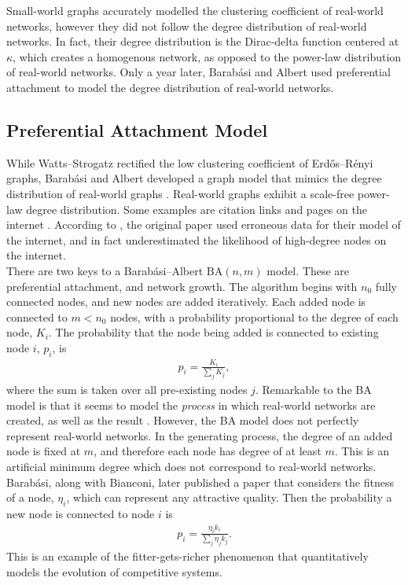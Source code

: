 Small-world graphs accurately modelled the clustering coefficient of real-world networks, however they did not follow the degree distribution of real-world networks. In fact, their degree distribution is the Dirac-delta function centered at $\kappa$, which creates a homogenous network, as opposed to the power-law distribution of real-world networks. Only a year later, Barab\'{a}si and Albert used preferential attachment to model the degree distribution of real-world networks.

 
\subsection{Preferential Attachment Model} \label{BA}
While Watts--Strogatz rectified the low clustering coefficient of Erd\H{o}s--R\'enyi graphs, Barab\'{a}si and Albert developed a graph model that mimics the degree distribution of real-world graphs \cite{RN55}. Real-world graphs exhibit a scale-free power-law degree distribution. Some examples are citation links and pages on the internet \cite{RN55}. According to \cite{RN56}, the original paper used erroneous data for their model of the internet, and in fact underestimated the likelihood of high-degree nodes on the internet. \\

There are two keys to a Barab\'{a}si--Albert $\mathrm{BA}(n,m)$ model. These are preferential attachment, and network growth. The algorithm begins with $n_0$ fully connected nodes, and new nodes are added iteratively. Each added node is connected to $m<n_0$ nodes, with a probability proportional to the degree of each node, $K_i$. The probability that the node being added is connected to existing node $i$, $p_i$, is
\begin{align*}
    p_i = \frac{K_i}{\sum_j K_j},
\end{align*}
where the sum is taken over all pre-existing nodes $j$. Remarkable to the BA model is that it seems to model the \emph{process} in which real-world networks are created, as well as the result \cite{RN55}. However, the BA model does not perfectly represent real-world networks. In the generating process, the degree of an added node is fixed at $m$, and therefore each node has degree of at least $m$. This is an artificial minimum degree which does not correspond to real-world networks. \\

Barab\'{a}si, along with Bianconi, \cite{RN59} later published a paper that considers the fitness of a node, $\eta_i$, which can represent any attractive quality. Then the probability a new node is connected to node $i$ is 
\begin{align*}
    p_i = \frac{\eta_ik_i}{\sum_j \eta_jk_j}.
\end{align*}
This is an example of the fitter-gets-richer phenomenon that quantitatively models the evolution of competitive systems. 

